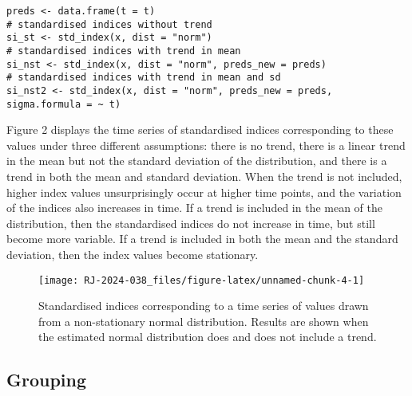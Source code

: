 \begin{verbatim}
preds <- data.frame(t = t)
# standardised indices without trend
si_st <- std_index(x, dist = "norm")
# standardised indices with trend in mean
si_nst <- std_index(x, dist = "norm", preds_new = preds)
# standardised indices with trend in mean and sd
si_nst2 <- std_index(x, dist = "norm", preds_new = preds, sigma.formula = ~ t)
\end{verbatim}

Figure 2 displays the time series of standardised indices corresponding to these values under three different assumptions: there is no trend, there is a linear trend in the mean but not the standard deviation of the distribution, and there is a trend in both the mean and standard deviation. When the trend is not included, higher index values unsurprisingly occur at higher time points, and the variation of the indices also increases in time. If a trend is included in the mean of the distribution, then the standardised indices do not increase in time, but still become more variable. If a trend is included in both the mean and the standard deviation, then the index values become stationary.

\begin{figure}

{\centering \texttt{[image: RJ-2024-038\_files/figure-latex/unnamed-chunk-4-1]} 

}

\caption{Standardised indices corresponding to a time series of values drawn from a non-stationary normal distribution. Results are shown when the estimated normal distribution does and does not include a trend.}\label{fig:unnamed-chunk-4}
\end{figure}

\hypertarget{grouping}{%
\subsection{Grouping}\label{grouping}}

